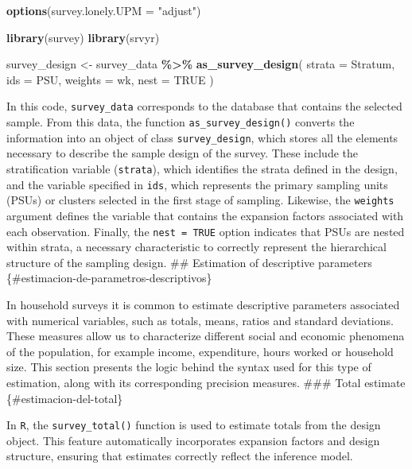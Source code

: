\documentclass[
  english,
  12pt,
]{book}
\newenvironment{Shaded}{\begin{snugshade}}{\end{snugshade}}
\newcommand{\AttributeTok}[1]{\textcolor[rgb]{0.13,0.29,0.53}{#1}}
\newcommand{\ConstantTok}[1]{\textcolor[rgb]{0.56,0.35,0.01}{#1}}
\newcommand{\FunctionTok}[1]{\textcolor[rgb]{0.13,0.29,0.53}{\textbf{#1}}}
\newcommand{\NormalTok}[1]{#1}
\newcommand{\OtherTok}[1]{\textcolor[rgb]{0.56,0.35,0.01}{#1}}
\newcommand{\SpecialCharTok}[1]{\textcolor[rgb]{0.81,0.36,0.00}{\textbf{#1}}}
\newcommand{\StringTok}[1]{\textcolor[rgb]{0.31,0.60,0.02}{#1}}
\begin{document}
\begin{Shaded}
\begin{Highlighting}[]
\FunctionTok{options}\NormalTok{(}\AttributeTok{survey.lonely.UPM =} \StringTok{"adjust"}\NormalTok{)}

\FunctionTok{library}\NormalTok{(survey)}
\FunctionTok{library}\NormalTok{(srvyr)}

\NormalTok{survey\_design }\OtherTok{\textless{}{-}}\NormalTok{ survey\_data }\SpecialCharTok{\%\textgreater{}\%}
  \FunctionTok{as\_survey\_design}\NormalTok{(}
    \AttributeTok{strata =}\NormalTok{ Stratum,}
    \AttributeTok{ids =}\NormalTok{ PSU,}
    \AttributeTok{weights =}\NormalTok{ wk,}
    \AttributeTok{nest =} \ConstantTok{TRUE}
\NormalTok{  )}
\end{Highlighting}
\end{Shaded}

In this code, \texttt{survey\_data} corresponds to the database that contains the selected sample. From this data, the function \texttt{as\_survey\_design()} converts the information into an object of class \texttt{survey\_design}, which stores all the elements necessary to describe the sample design of the survey. These include the stratification variable (\texttt{strata}), which identifies the strata defined in the design, and the variable specified in \texttt{ids}, which represents the primary sampling units (PSUs) or clusters selected in the first stage of sampling. Likewise, the \texttt{weights} argument defines the variable that contains the expansion factors associated with each observation. Finally, the \texttt{nest\ =\ TRUE} option indicates that PSUs are nested within strata, a necessary characteristic to correctly represent the hierarchical structure of the sampling design.
\#\# Estimation of descriptive parameters \{\#estimacion-de-parametros-descriptivos\}

In household surveys it is common to estimate descriptive parameters associated with numerical variables, such as totals, means, ratios and standard deviations. These measures allow us to characterize different social and economic phenomena of the population, for example income, expenditure, hours worked or household size. This section presents the logic behind the syntax used for this type of estimation, along with its corresponding precision measures.
\#\#\# Total estimate \{\#estimacion-del-total\}

In \texttt{R}, the \texttt{survey\_total()} function is used to estimate totals from the design object. This feature automatically incorporates expansion factors and design structure, ensuring that estimates correctly reflect the inference model.
\end{document}
